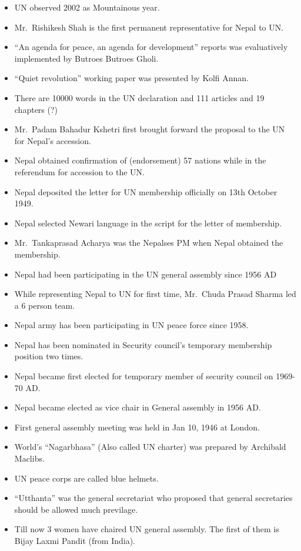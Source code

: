 \documentclass[
  openany]{book}
\begin{document}
\begin{itemize}
\item
  UN observed 2002 as Mountainous year.
\item
  Mr.~Rishikesh Shah is the first permanent representative for Nepal to UN.
\item
  ``An agenda for peace, an agenda for development'' reports was evaluatively implemented by Butroes Butroes Gholi.
\item
  ``Quiet revolution'' working paper was presented by Kolfi Annan.
\item
  There are 10000 words in the UN declaration and 111 articles and 19 chapters (?)
\item
  Mr.~Padam Bahadur Kshetri first brought forward the proposal to the UN for Nepal's accession.
\item
  Nepal obtained confirmation of (endorsement) 57 nations while in the referendum for accession to the UN.
\item
  Nepal deposited the letter for UN membership officially on 13th October 1949.
\item
  Nepal selected Newari language in the script for the letter of membership.
\item
  Mr.~Tankaprasad Acharya was the Nepalses PM when Nepal obtained the membership.
\item
  Nepal had been participating in the UN general assembly since 1956 AD
\item
  While representing Nepal to UN for first time, Mr.~Chuda Prasad Sharma led a 6 person team.
\item
  Nepal army has been participating in UN peace force since 1958.
\item
  Nepal has been nominated in Security council's temporary membership position two times.
\item
  Nepal became first elected for temporary member of security council on 1969-70 AD.
\item
  Nepal became elected as vice chair in General assembly in 1956 AD.
\item
  First general assembly meeting was held in Jan 10, 1946 at London.
\item
  World's ``Nagarbhasa'' (Also called UN charter) was prepared by Archibald Maclibs.
\item
  UN peace corps are called blue helmets.
\item
  ``Utthanta'' was the general secretariat who proposed that general secretaries should be allowed much previlage.
\item
  Till now 3 women have chaired UN general assembly. The first of them is Bijay Laxmi Pandit (from India).

\end{itemize}
\end{document}
